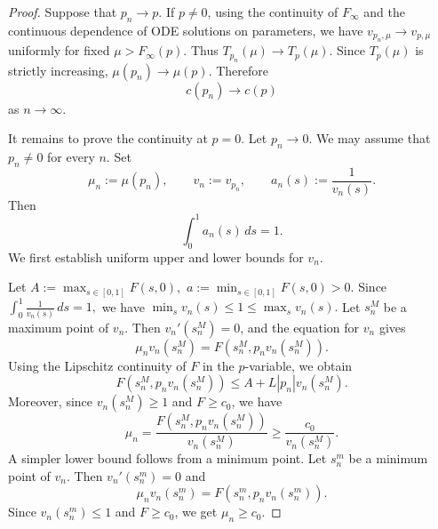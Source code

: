 \documentclass[preprint]{elsarticle}
\numberwithin{equation}{section}
\begin{document}
\begin{proof}
 Suppose that
$
p_n\to p.
$
If $p\ne0$, using the continuity of $F_\infty$ and the continuous dependence of ODE solutions on parameters, we have
$
v_{p_n,\mu}\to v_{p,\mu}
$
uniformly for fixed
$
\mu>F_\infty(p).
$
Thus
$
T_{p_n}(\mu)\to T_p(\mu).
$
Since $T_p(\mu)$ is strictly increasing,
$
\mu(p_n)\to\mu(p).
$
Therefore
$$
c(p_n)\to c(p)
$$
as $n\to\infty$.

It remains to prove the continuity at $p=0$. Let
$
p_n\to0.
$
We may assume that $p_n\ne0$ for every $n$. Set
$$
\mu_n:=\mu(p_n),
\qquad
v_n:=v_{p_n},
\qquad
a_n(s):=\frac{1}{v_n(s)}.
$$
Then
\begin{equation*}
\int_0^1 a_n(s)\,ds=1.
\end{equation*}
We first establish uniform upper and lower bounds for $v_n$.

Let
$
A:=\max_{s\in[0,1]}F(s,0),
$ 
$
a:=\min_{s\in[0,1]}F(s,0)>0.
$
Since
$
\int_0^1\frac{1}{v_n(s)}\,ds=1,
$
we have
$
\min_s v_n(s)\le1\le\max_s v_n(s).
$
Let $s_n^M$ be a maximum point of $v_n$. Then $v_n'(s_n^M)=0$, and the equation for $v_n$ gives
\begin{equation*}
\mu_n v_n(s_n^M)=F(s_n^M,p_nv_n(s_n^M)).
\end{equation*}
Using the Lipschitz continuity of $F$ in the $p$-variable, we obtain
\begin{equation*}
F(s_n^M,p_nv_n(s_n^M))
\le
A+L|p_n|v_n(s_n^M).
\end{equation*}
Moreover, since $v_n(s_n^M)\ge1$ and $F\ge c_0$, we have
\begin{equation*}
\mu_n
=
\frac{F(s_n^M,p_nv_n(s_n^M))}{v_n(s_n^M)}
\ge
\frac{c_0}{v_n(s_n^M)}.
\end{equation*}
A simpler lower bound follows from a minimum point. Let $s_n^m$ be a minimum point of $v_n$. Then $v_n'(s_n^m)=0$ and
\begin{equation*}
\mu_n v_n(s_n^m)=F(s_n^m,p_nv_n(s_n^m)).
\end{equation*}
Since $v_n(s_n^m)\le1$ and $F\ge c_0$, we get $\mu_n\ge c_0.$


\end{proof}
\end{document}
